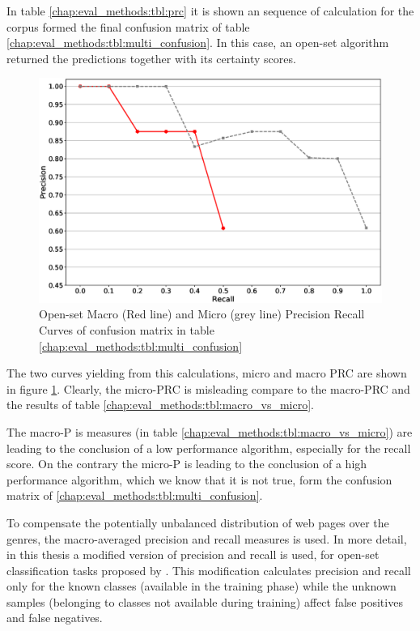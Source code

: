 In table \ref{chap:eval_methods:tbl:prc} it is shown an sequence of calculation for the corpus formed the final confusion matrix of table \ref{chap:eval_methods:tbl:multi_confusion}. In this case, an open-set algorithm returned the predictions together with its certainty scores. 

\begin{figure}[t]
	\begin{center}
    	\includegraphics[scale=0.45]{Figures/pr_macro_micro_example.eps}
		\caption{Open-set Macro (Red line) and Micro (grey line) Precision Recall Curves of confusion matrix in table \ref{chap:eval_methods:tbl:multi_confusion}}
		\label{chap:eval_methods:fig:prc_macro}
	\end{center}
\end{figure}

The two curves yielding from this calculations, micro and macro PRC are shown in figure \ref{chap:eval_methods:fig:prc_macro}. Clearly, the micro-PRC is misleading compare to the macro-PRC and the results of table \ref{chap:eval_methods:tbl:macro_vs_micro}. 

The macro-P is measures (in table \ref{chap:eval_methods:tbl:macro_vs_micro}) are leading to the conclusion of a low performance algorithm, especially for the recall score. On the contrary the micro-P is leading to the conclusion of a high performance algorithm, which we know that it is not true, form the confusion matrix of \ref{chap:eval_methods:tbl:multi_confusion}.

To compensate the potentially unbalanced distribution of web pages over the genres, the macro-averaged precision and recall measures is used. In more detail, in this thesis a modified version of precision and recall is used, for open-set classification tasks proposed by \parencite{mendesjunior2016}. This modification calculates precision and recall only for the known classes (available in the training phase) while the unknown samples (belonging to classes not available during training) affect false positives and false negatives.

